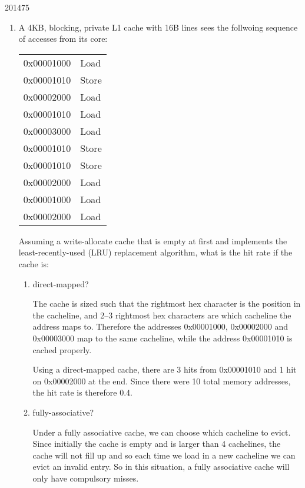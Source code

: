 \documentclass[10pt,\jkfside,a4paper]{article}
\begin{document}
\begin{examquestion}{2014}{7}{5}

\begin{enumerate}[label=(\alph*)]

\item A 4KB, blocking, private L1 cache with 16B lines sees the follwoing
sequence of accesses from its core:

\begin{tabular}{rl}
0x00001000 & Load \\
0x00001010 & Store \\
0x00002000 & Load \\
0x00001010 & Load \\
0x00003000 & Load \\
0x00001010 & Store \\
0x00001010 & Store \\
0x00002000 & Load \\
0x00001000 & Load \\
0x00002000 & Load \\
\end{tabular}

Assuming a write-allocate cache that is empty at first and implements the
least-recently-used (LRU) replacement algorithm, what is the hit rate if the
cache is:

\begin{enumerate}[label=(\roman*)]

\item direct-mapped?

The cache is sized such that the rightmost hex character is the position in
the cacheline, and 2--3 rightmost hex characters are which cacheline
the address maps to. Therefore the addresses 0x00001000, 0x00002000 and
0x00003000 map to the same cacheline, while the address 0x00001010 is cached
properly.

Using a direct-mapped cache, there are 3 hits from 0x00001010 and 1 hit on
0x00002000 at the end. Since there were 10 total memory addresses, the hit
rate is therefore 0.4.

\item fully-associative?

Under a fully associative cache, we can choose which cacheline to evict.
Since initially the cache is empty and is larger than 4 cachelines, the cache
will not fill up and so each time we load in a new cacheline we can evict an
invalid entry. So in this situation, a fully associative cache will only have
compulsory misses.


\end{enumerate}
\end{enumerate}
\end{examquestion}
\end{document}
